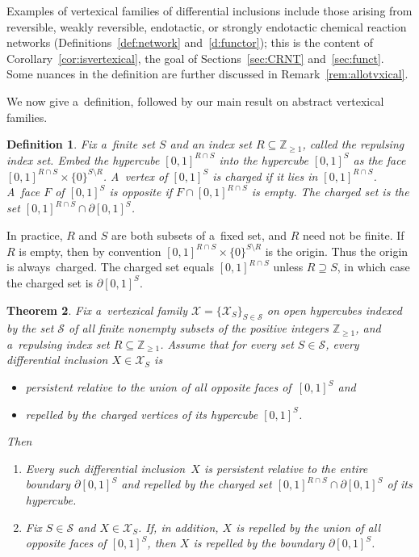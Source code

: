 \documentclass[11pt]{article}
\newtheorem{Theorem}{Theorem}[section]
\newtheorem{Definition}[Theorem]{Definition}
\begin{document}
Examples of vertexical families of dif\/ferential inclusions include those arising from reversible, weakly reversible,
endotactic, or strongly endotactic chemical reaction networks  (Def\/initions~\ref{def:network} and~\ref{d:functor});
this is the content of Corollary~\ref{cor:isvertexical}, the goal of Sections~\ref{sec:CRNT} and~\ref{sec:funct}.
Some nuances in the def\/inition are further discussed in Remark~\ref{rem:allotvxical}.

We now give a~def\/inition, followed by our main result on abstract vertexical families.
\begin{Definition}
\label{d:charged}
Fix a~f\/inite set $S$ and an index set $R\subseteq\mathbb{Z}_{\geq1}$, called the \emph{repulsing index set}.
Embed the hypercube $[0,1]^{R\cap S}$ into the hypercube $[0,1]^S$ as the face $[0,1]^{R\cap S}\times\{0\}^{S\setminus
R}$.
A~vertex of $[0,1]^S$ is \emph{charged} if it lies in $[0,1]^{R\cap S}$.
A~face $F$ of $[0,1]^S$ is \emph{opposite} if $F\cap[0,1]^{R\cap S}$ is empty.
The \emph{charged set} is the set $[0,1]^{R\cap S}\cap\partial[0,1]^S$.
\end{Definition}

In practice, $R$ and $S$ are both subsets of a~f\/ixed set, and $R$ need not be f\/inite.
If $R$ is empty, then by convention $[0,1]^{R\cap S}\times\{0\}^{S\setminus R}$ is the origin.
Thus the origin is always~charged.
The charged set equals $[0,1]^{R\cap S}$ unless $R\supseteq S$, in which case the charged set is $\partial[0,1]^S$.
\begin{Theorem}
\label{t:vertexical}
Fix a~vertexical family $\mathcal X=\{\mathcal X_S\}_{S\in\mathcal S}$ on open hypercubes indexed by the set $\mathcal
S$ of all finite nonempty subsets of the positive integers $\mathbb{Z}_{\geq1}$, and a~repulsing index set
$R\subseteq\mathbb{Z}_{\geq1}$.
Assume that for every set $S\in\mathcal S$, every differential inclusion $X\in\mathcal X_S$ is
\begin{itemize}\itemsep=-0.5pt
\item persistent relative to the union of all opposite faces of\/~$[0,1]^S$ and \item repelled by the charged vertices
of its hypercube $[0,1]^S$.
\end{itemize}
Then
\begin{enumerate}\itemsep=-0.5pt
\item[$1.$] Every such differential inclusion~$X$ is persistent relative to the entire boundary $\partial[0,1]^S$ and
repelled by the charged set $[0,1]^{R\cap S}\cap\partial[0,1]^S$ of its hypercube.
\item[$2.$] Fix $S\in\mathcal S$ and $X\in\mathcal X_S$.
If, in addition, $X$ is repelled by the union of all opposite faces of\/ $[0,1]^S$, then $X$ is repelled by the
boundary $\partial[0,1]^S$.
\end{enumerate}
\end{Theorem}
\end{document}
